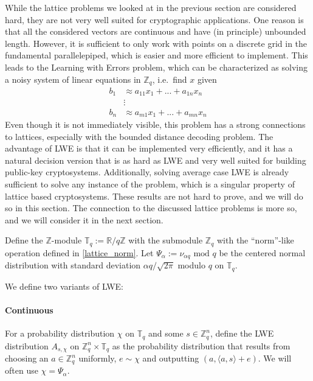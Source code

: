 \documentclass{report}
\newcommand{\T}{\mathbb{T}}
\newcommand{\Z}{\mathbb{Z}}
\newcommand{\R}{\mathbb{R}}
\renewcommand{\mod}{\text{ mod }}
\begin{document}
\motivation
While the lattice problems we looked at in the previous section are considered hard, they are not very well suited for cryptographic applications. One reason is that all the considered vectors are continuous and have (in principle) unbounded length. However, it is sufficient to only work with points on a discrete grid in the fundamental parallelepiped, which is easier and more efficient to implement. This leads to the Learning with Errors problem, which can be characterized as solving a noisy system of linear equations in $\Z_q$, i.e.\ find $x$ given
\begin{equation}
\begin{split}
b_1 &\approx a_{11} x_1 + ... + a_{1n} x_n \\
& \vdots \\
b_n &\approx a_{m1} x_1 + ... + a_{mn} x_n \nonumber
\end{split}
\end{equation}
Even though it is not immediately visible, this problem has a strong connections to lattices, especially with the bounded distance decoding problem. The advantage of LWE is that it can be implemented very efficiently, and it has a natural decision version that is as hard as LWE and very well suited for building public-key cryptosystems. Additionally, solving average case LWE is already sufficient to solve any instance of the problem, which is a singular property of lattice based cryptosystems. These results are not hard to prove, and we will do so in this section. The connection to the discussed lattice problems is more so, and we will consider it in the next section.

Define the $\Z$-module $\T_q := \R / q\Z$ with the submodule $\Z_q$ with the ``norm''-like operation defined in \ref{lattice_norm}. Let $\Psi_\alpha := \nu_{\alpha q} \mod q$ be the centered normal distribution with standard deviation $\alpha q / \sqrt{2\pi}$ modulo $q$ on $\T_q$.

We define two variants of LWE:
\paragraph{Continuous}
For a probability distribution $\chi$ on $\T_q$ and some $s \in \Z_q^n$, define the LWE distribution $A_{s, \chi}$ on $\Z_q^n \times \T_q$ as the probability distribution that results from choosing an $a \in \Z_q^n$ uniformly, $e \sim \chi$ and outputting $(a, \langle a, s \rangle + e)$. We will often use $\chi = \Psi_\alpha$.
\end{document}

